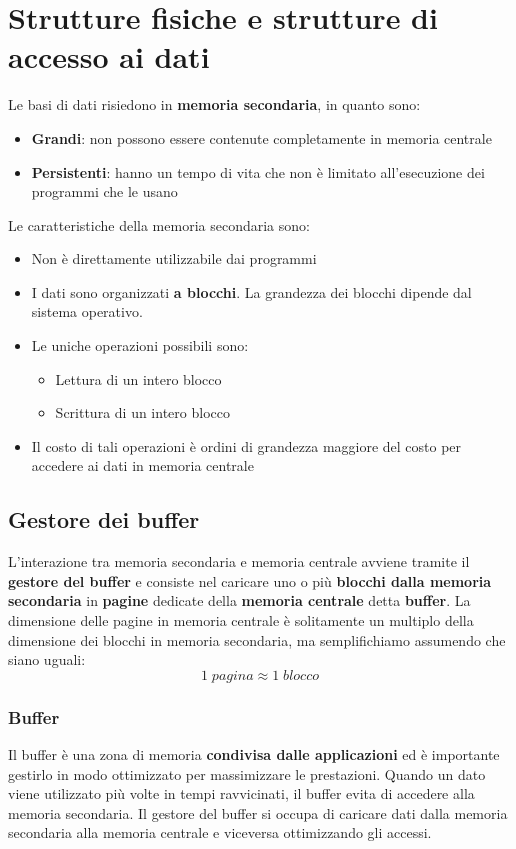 \documentclass[a4paper,twoside]{article}
\begin{document}
\section{Strutture fisiche e strutture di accesso ai dati}
Le basi di dati risiedono in \textbf{memoria secondaria}, in quanto sono:
\begin{itemize}
  \item \textbf{Grandi}: non possono essere contenute completamente in memoria centrale
  \item \textbf{Persistenti}: hanno un tempo di vita che non è limitato all'esecuzione
    dei programmi che le usano
\end{itemize}
Le caratteristiche della memoria secondaria sono:
\begin{itemize}
  \item Non è direttamente utilizzabile dai programmi

  \item I dati sono organizzati \textbf{a blocchi}. La grandezza dei
    blocchi dipende dal sistema operativo.

  \item Le uniche operazioni possibili sono:
    \begin{itemize}
      \item Lettura di un intero blocco
      \item Scrittura di un intero blocco
    \end{itemize}

  \item Il costo di tali operazioni è ordini di grandezza maggiore del costo per
    accedere ai dati in memoria centrale
\end{itemize}

\subsection{Gestore dei buffer}
L'interazione tra memoria secondaria e memoria centrale avviene tramite il
\textbf{gestore del buffer} e consiste nel caricare uno o più \textbf{blocchi
dalla memoria secondaria} in \textbf{pagine} dedicate della \textbf{memoria centrale}
detta \textbf{buffer}. La dimensione delle pagine in memoria centrale è solitamente
un multiplo della dimensione dei blocchi in memoria secondaria, ma semplifichiamo
assumendo che siano uguali:
\[
  1\; pagina \approx 1\; blocco
\] 

\subsubsection{Buffer}
Il buffer è una zona di memoria \textbf{condivisa dalle applicazioni} ed è importante
gestirlo in modo ottimizzato per massimizzare le prestazioni. Quando un dato viene
utilizzato più volte in tempi ravvicinati, il buffer evita di accedere alla memoria
secondaria. Il gestore del buffer si occupa di caricare dati dalla memoria secondaria
alla memoria centrale e viceversa ottimizzando gli accessi.
\end{document}
